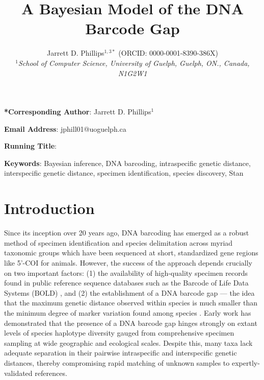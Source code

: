 \documentclass[12pt]{article}
\makeatletter
\renewcommand{\maketitle}{\bgroup\setlength{\parindent}{0pt}
\begin{flushleft}
  \textbf{\@title}

  \@author
\end{flushleft}\egroup
}
\makeatother
\begin{document}
\linenumbers

\title{A Bayesian Model of the DNA Barcode Gap}

\author{Jarrett D. Phillips$^{1, 3*}$ (ORCID: 0000-0001-8390-386X)  \\
\textit{$^1$School of Computer Science, University of Guelph, Guelph, ON., Canada, N1G2W1}}

\date{}

\maketitle

\vspace{2mm}

\noindent \textbf{*Corresponding Author}: Jarrett D. Phillips$^{1}$

\noindent \textbf{Email Address}: jphill01@uoguelph.ca

\noindent \textbf{Running Title}: 

\newpage

\begin{abstract}

\end{abstract}

\textbf{Keywords}: Bayesian inference, DNA barcoding, intraspecific genetic distance, \\ interspecific genetic distance, specimen identification, species discovery, Stan 

\vspace{2mm}

\section{Introduction}

Since its inception over 20 years ago, DNA barcoding \citep{hebert2003biological, hebert2003barcoding} has emerged as a robust method of specimen identification and species delimitation across myriad \\ taxonomic groups which have been sequenced at short, standardized gene regions like 5'-COI for animals. However, the success of the approach depends crucially on two important factors: (1) the availability of high-quality specimen records found in public reference sequence databases such as the Barcode of Life Data Systems (BOLD) \cite{ratnasingham2007bold}, and (2) the establishment of a DNA barcode gap --- the idea that the maximum genetic distance observed within species is much smaller than the minimum degree of marker variation found among species \citep{meyer2005dna, meier2008use}. Early work has demonstrated that the presence of a DNA barcode gap hinges strongly on extant levels of species haplotype diversity gauged from comprehensive specimen sampling at wide geographic and ecological scales. Despite this, many taxa lack adequate separation in their pairwise intraspecific and interspecific genetic distances, thereby compromising rapid matching of unknown samples to expertly-validated references.
\end{document}
